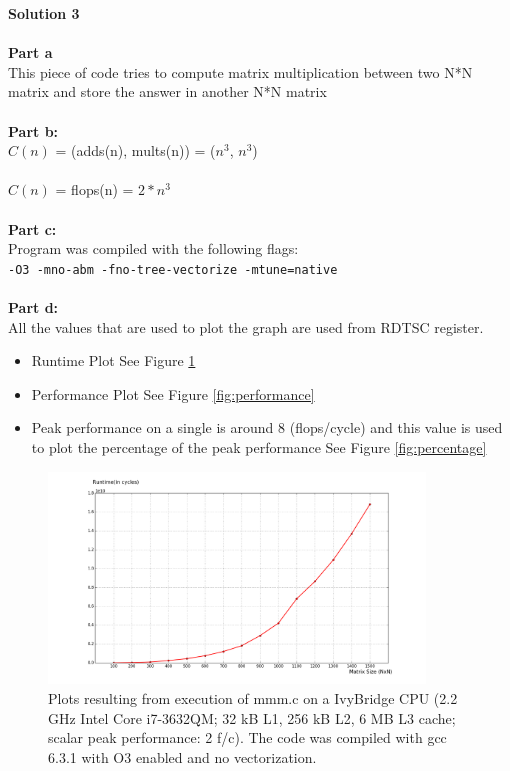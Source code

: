 \documentclass[letterpaper, 11pt]{article}
\begin{document}
\textbf{Solution 3}\\ \\
\textbf{Part a} \\
This piece of code tries to compute matrix multiplication between two N*N matrix and store the answer in another N*N matrix \\ \\
\textbf{Part b:} \\
$C(n)$ = (adds(n), mults(n)) = ($n^3$, $n^3$) \\ \\
$C(n)$ = flops(n) = $2*n^3$ \\ \\
\textbf{Part c:}\\
Program was compiled with the following flags: \\
\texttt{-O3 -mno-abm -fno-tree-vectorize -mtune=native} \\ \\
\textbf{Part d:} \\ 
All the values that are used to plot the graph are used from RDTSC register. 
\begin{itemize}
\item Runtime Plot See Figure \ref{fig:runtime}
\item Performance Plot See Figure \ref{fig:performance} 
\item Peak performance on a single is around 8 (flops/cycle) and this value is used to plot the percentage of the peak performance See Figure \ref{fig:percentage}
\end{itemize}

\begin{figure}[h!]
    \centering
    \includegraphics[width=100mm]{sol_3_1}
    \caption{Plots resulting from execution of mmm.c on a IvyBridge CPU (2.2 GHz Intel Core i7-3632QM; 32 kB L1, 256 kB L2, 6 MB L3 cache; scalar peak performance: 2 f/c). The code was compiled with gcc 6.3.1 with O3 enabled and no vectorization.}
    \label{fig:runtime}
\end{figure}
\end{document}
